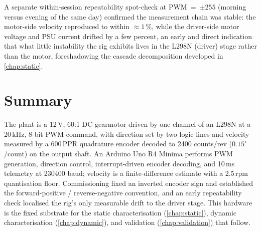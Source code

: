 A separate within-session repeatability spot-check at PWM~=~$\pm 255$ (morning versus evening of the same day) confirmed the measurement chain was stable: the motor-side velocity reproduced to within ${\approx}1\,\%$, while the driver-side motor voltage and PSU current drifted by a few percent, an early and direct indication that what little instability the rig exhibits lives in the L298N (driver) stage rather than the motor, foreshadowing the cascade decomposition developed in \cref{chap:static}.

\section{Summary}
\label{sec:hw-summary}

The plant is a 12\,V, 60:1 DC gearmotor driven by one channel of an L298N at a 20\,kHz, 8-bit PWM command, with direction set by two logic lines and velocity measured by a 600\,PPR quadrature encoder decoded to 2400 counts/rev ($0.15^\circ$/count) on the output shaft. An Arduino Uno R4 Minima performs PWM generation, direction control, interrupt-driven encoder decoding, and 10\,ms telemetry at 230400 baud; velocity is a finite-difference estimate with a 2.5\,rpm quantisation floor. Commissioning fixed an inverted encoder sign and established the forward-positive / reverse-negative convention, and an early repeatability check localised the rig's only measurable drift to the driver stage. This hardware is the fixed substrate for the static characterisation (\cref{chap:static}), dynamic characterisation (\cref{chap:dynamic}), and validation (\cref{chap:validation}) that follow.
